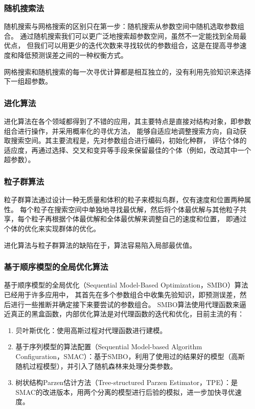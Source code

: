 \subsubsection{随机搜索法}

随机搜索与网格搜索的区别只在第一步：随机搜索从参数空间中随机选取参数组合。
通过随机搜索我们可以更广泛地搜索超参数空间，虽然不一定能找到全局最优点，
但我们可以用更少的迭代次数来寻找较优的参数组合，这是在提高寻参速度和降低预测误差之间的一种权衡方式。

网格搜索和随机搜索的每一次寻优计算都是相互独立的，没有利用先验知识来选择下一组超参数。

\subsubsection{进化算法}

进化算法在各个领域都得到了不错的应用，其主要特点是直接对结构对象，即参数组合进行操作，并采用概率化的寻优方法，
能够自适应地调整搜索方向，自动获取搜索空间。其主要流程是，先对参数组合进行编码，初始化种群，
评估个体的适应度，再通过选择、交叉和变异等手段来保留最佳的个体（例如，改动其中一个超参数）。

\subsubsection{粒子群算法}

粒子群算法通过设计一种无质量和体积的粒子来模拟鸟群，仅有速度和位置两种属性。
每个粒子在搜索空间中单独地寻找最优解，然后将个体最优解与其他粒子共享，每个粒子再根据个体最优解和全体最优解来调整自己的速度和位置，
即通过个体的优化来实现群体的优化。

进化算法与粒子群算法的缺陷在于，算法容易陷入局部最优值。

\subsubsection{基于顺序模型的全局优化算法}

基于顺序模型的全局优化（Sequential Model-Based Optimization，SMBO）算法已经用于许多应用中，
其首先在多个参数组合中收集先验知识，即预测误差，然后进行一些推断并确定接下来要尝试的参数组合。
SMBO算法使用代理函数来逼近真正的黑盒函数，内部优化算法是对代理函数的迭代和优化，目前主流的有：
\begin{enumerate}
    \item 贝叶斯优化：使用高斯过程对代理函数进行建模。
    \item 基于序列模型的算法配置（Sequential Model-based Algorithm Configuration，SMAC）：基于SMBO，利用了使用过的结果好的模型（高斯随机过程模型），并引入了随机森林来处理分类参数。
    \item 树状结构Parzen估计方法（Tree-structured Parzen Estimator，TPE）：是SMAC的改进版本，用两个分离的模型进行后验的模拟，进一步加快寻优速度。
\end{enumerate}

